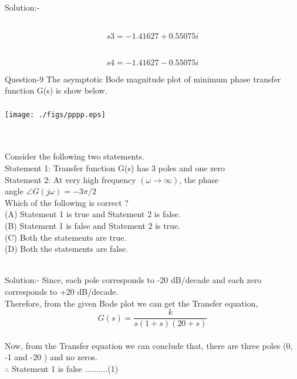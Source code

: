 \documentclass[journal,12pt,twocolumn]{IEEEtran}
\begin{document}
\begin{frame}{Solution:- }
\begin{frame}{}
\\$$s3=−1.41627+0.55075i$$

\\$$s4=−1.41627−0.55075i$$
\end{frame}

\begin{frame}{Question-9 }
The asymptotic Bode magnitude plot of  minimum phase transfer function
G(s) is show below.
\\\\
\texttt{[image: ./figs/pppp.eps]}
\end{frame}

\begin{frame}
\\\\  
Consider the following two statements.\\
\quad Statement 1: Transfer function G(s) has 3 poles and one zero \\
\quad Statement 2: At very high frequency $(\omega \to \infty)$, the phase \\  \quad \quad \quad \quad \quad \quad angle $ \angle G(j\omega)=-3\pi/2$ \\ 
Which of the following is correct ? \\
(A) Statement 1 is true and Statement 2 is false.\\
(B) Statement 1 is false and Statement 2 is true.\\
(C) Both the statements are true.\\
(D) Both the statements are false.
\\\\
\end{frame}


\begin{frame}{Solution:- }
Since, each pole corresponds to -20 dB/decade  
and each zero corresponds to +20 dB/decade.\\
Therefore, from the given Bode plot we can get the Transfer equation,\\
\[ G(s) = \frac{k}{s(1+s)(20+s)} \]
\\
Now, from the Transfer equation we can conclude that,
there are three poles (0, -1 and -20 ) and no zeros.\\
\quad \quad \quad $\therefore$ Statement 1 is false \quad \quad \quad ..........(1)




\end{frame}




\end{frame}
\end{document}
